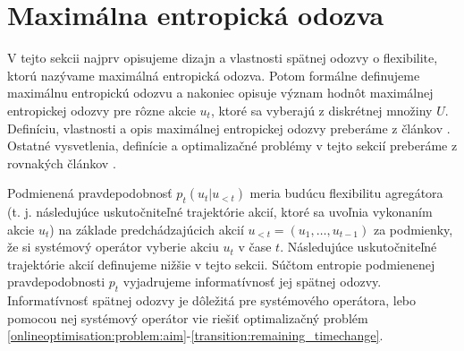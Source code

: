 \section{Maximálna entropická odozva}
\label{mef:definition:section}

V tejto sekcii najprv opisujeme dizajn a vlastnosti spätnej odozvy o flexibilite, ktorú nazývame maximálná entropická odozva. Potom formálne definujeme maximálnu entropickú odozvu a nakoniec opisuje význam hodnôt maximálnej entropickej odozvy pre rôzne akcie $u_{t}$, ktoré sa vyberajú z diskrétnej množiny $U$. Definíciu, vlastnosti a opis maximálnej entropickej odozvy preberáme z článkov \cite{li2020realtimeflexibilityfeedbackclosedloop, Li_2021}. Ostatné vysvetlenia, definície a optimalizačné problémy v tejto sekcií preberáme z rovnakých článkov \cite{li2020realtimeflexibilityfeedbackclosedloop, Li_2021}. 




Podmienená pravdepodobnosť $p_{t}(u_{t} | u_{<t})$ meria budúcu flexibilitu agregátora (t. j. následujúce uskutočniteľné trajektórie akcií, ktoré sa uvoľnia vykonaním akcie $u_{t}$) na základe predchádzajúcich akcií $u_{<t} = (u_{1}, \dots, u_{t - 1})$ za podmienky, že si systémový operátor vyberie akciu $u_{t}$ v čase $t$. Následujúce uskutočniteľné trajektórie akcií definujeme nižšie v tejto sekcii. Súčtom entropie podmienenej pravdepodobnosti $p_{t}$ vyjadrujeme informatívnosť jej spätnej odozvy. Informatívnosť spätnej odozvy je dôležitá pre systémového operátora, lebo pomocou nej systémový operátor vie riešiť optimalizačný problém \eqref{onlineoptimisation:problem:aim}-\eqref{transition:remaining_timechange}.




